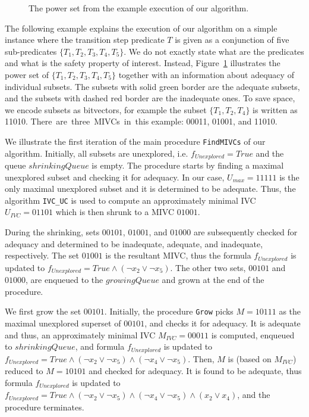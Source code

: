 \begin{figure}[t]
\centering

\caption{The power set from the example execution of our algorithm.}
\label{fig:running_cube}
\end{figure}

The following example explains the execution of our algorithm on a simple instance where the transition step predicate $T$ is given as a conjunction of five sub-predicates $\{T_1, T_2, T_3, T_4, T_5\}$. We do not exactly state what are the predicates and what is the safety property of interest. Instead, Figure~\ref{fig:running_cube} illustrates the power set of $\{T_1, T_2, T_3, T_4, T_5\}$ together with an information about adequacy of individual subsets. The subsets with solid green border are the adequate subsets, and the subsets with dashed red border are the inadequate ones. To save space, we encode subsets as bitvectors, for example the subset $\{T_1, T_2, T_4\}$ is written as 11010. There~are~three~MIVCs~in~this example: 00011, 01001, and 11010.

We illustrate the first iteration of the main procedure \texttt{FindMIVCs} of our algorithm. Initially, all subsets are unexplored, i.e. $f_{\mathit{Unexplored}} = True$ and the queue $\mathit{shrinkingQueue}$ is empty. The procedure starts by finding a maximal unexplored subset and checking it for adequacy. In our case, $U_{\mathit{max}} = 11111$ is the only maximal unexplored subset and it is determined to be adequate. Thus, the algorithm \texttt{IVC\_UC} is used to compute an approximately minimal IVC $U_{\mathit{IVC}} = 01101$ which is then shrunk to a MIVC $01001$.

During the shrinking, sets $00101$, $01001$, and $01000$ are subsequently checked for adequacy and determined to be inadequate, adequate, and inadequate, respectively. The set $01001$ is the resultant MIVC, thus the formula $f_{\mathit{Unexplored}}$ is updated to $f_{\mathit{Unexplored}} = \mathit{True} \wedge (\neg x_2 \vee \neg x_5)$. The other two sets, $00101$ and $01000$, are enqueued to the $\mathit{growingQueue}$ and 
grown at the end of the procedure.

We first grow the set $00101$. Initially, the procedure \texttt{Grow} picks $M = 10111$ as the maximal unexplored superset of $00101$, and checks it for adequacy. It is adequate and thus, an approximately minimal IVC $M_{\mathit{IVC}} = 00011$ is computed, enqueued to $\mathit{shrinkingQueue}$, and formula $f_{\mathit{Unexplored}}$ is updated to $f_{\mathit{Unexplored}} = \mathit{True} \wedge (\neg x_2 \vee \neg x_5) \wedge	(\neg x_4 \vee \neg x_5)$. Then, $M$ is (based on $M_{\mathit{IVC}}$) reduced to $M = 10101$ and checked for adequacy. It is found to be adequate, thus formula $f_{\mathit{Unexplored}}$ is updated to $f_{\mathit{Unexplored}} = \mathit{True} \wedge (\neg x_2 \vee \neg x_5) \wedge	(\neg x_4 \vee \neg x_5) \wedge (x_2 \vee x_4)$, and the procedure terminates.

